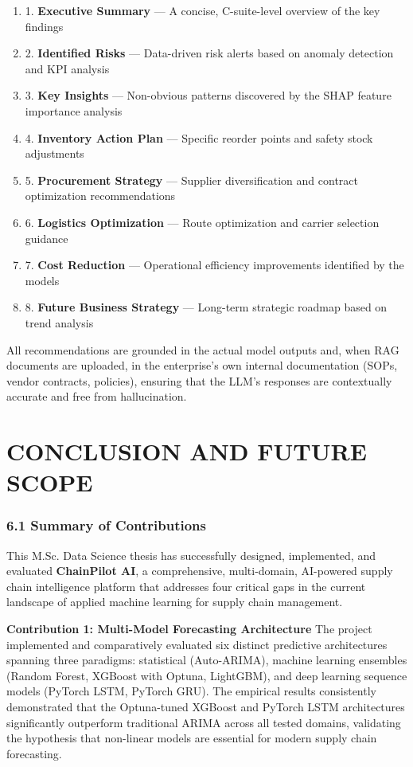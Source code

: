 \documentclass[12pt, a4paper]{report}
\begin{document}
\begin{enumerate}
\item 1. \textbf{Executive Summary} — A concise, C-suite-level overview of the key findings
\item 2. \textbf{Identified Risks} — Data-driven risk alerts based on anomaly detection and KPI analysis
\item 3. \textbf{Key Insights} — Non-obvious patterns discovered by the SHAP feature importance analysis
\item 4. \textbf{Inventory Action Plan} — Specific reorder points and safety stock adjustments
\item 5. \textbf{Procurement Strategy} — Supplier diversification and contract optimization recommendations
\item 6. \textbf{Logistics Optimization} — Route optimization and carrier selection guidance
\item 7. \textbf{Cost Reduction} — Operational efficiency improvements identified by the models
\item 8. \textbf{Future Business Strategy} — Long-term strategic roadmap based on trend analysis
\end{enumerate}

All recommendations are grounded in the actual model outputs and, when RAG documents are uploaded, in the enterprise's own internal documentation (SOPs, vendor contracts, policies), ensuring that the LLM's responses are contextually accurate and free from hallucination.


\clearpage

\chapter{CONCLUSION AND FUTURE SCOPE}

\subsection{6.1 Summary of Contributions}

This M.Sc. Data Science thesis has successfully designed, implemented, and evaluated \textbf{ChainPilot AI}, a comprehensive, multi-domain, AI-powered supply chain intelligence platform that addresses four critical gaps in the current landscape of applied machine learning for supply chain management.

\textbf{Contribution 1: Multi-Model Forecasting Architecture}
The project implemented and comparatively evaluated six distinct predictive architectures spanning three paradigms: statistical (Auto-ARIMA), machine learning ensembles (Random Forest, XGBoost with Optuna, LightGBM), and deep learning sequence models (PyTorch LSTM, PyTorch GRU). The empirical results consistently demonstrated that the Optuna-tuned XGBoost and PyTorch LSTM architectures significantly outperform traditional ARIMA across all tested domains, validating the hypothesis that non-linear models are essential for modern supply chain forecasting.
\end{document}

